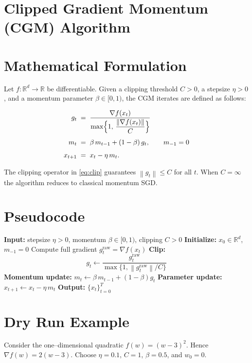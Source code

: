 \documentclass{article}
\newcommand{\norm}[1]{\left\lVert #1 \right\rVert}
\begin{document}
\section*{Clipped Gradient Momentum (CGM) Algorithm}

\section*{Mathematical Formulation}
Let $f:\mathbb{R}^d\rightarrow\mathbb{R}$ be differentiable.  
Given a clipping threshold $C>0$, a stepsize $\eta>0$, and a momentum
parameter $\beta\in[0,1)$, the CGM iterates are defined as follows:

\begin{align}
    g_t &\;=\; \frac{\nabla f(x_t)}{\displaystyle \max\Bigl\{1,\,
        \frac{\norm{\nabla f(x_t)}}{C}\Bigr\}} \label{eq:clip}\\[4pt]
    m_t &\;=\; \beta\, m_{t-1} + (1-\beta)\, g_t ,\qquad m_{-1}=0 \label{eq:momentum}\\[4pt]
    x_{t+1} &\;=\; x_t - \eta\, m_t . \label{eq:update}
\end{align}

The clipping operator in \eqref{eq:clip} guarantees $\norm{g_t}\le C$ for all $t$.  
When $C=\infty$ the algorithm reduces to classical momentum SGD.

\section*{Pseudocode}
\begin{algorithm}[H]
\caption{Clipped Gradient Momentum (CGM)}
\begin{algorithmic}[1]
\STATE \textbf{Input:} stepsize $\eta>0$, momentum $\beta\in[0,1)$, clipping $C>0$
\STATE \textbf{Initialize:} $x_0\in\mathbb{R}^d$, $m_{-1}=0$
    \STATE Compute full gradient $g^{\text{raw}}_t=\nabla f(x_t)$
    \STATE \textbf{Clip:} 
    \[
        g_t \leftarrow \frac{g^{\text{raw}}_t}{\max\{1,\norm{g^{\text{raw}}_t}/C\}}
    \]
    \STATE \textbf{Momentum update:} $m_t \leftarrow \beta\,m_{t-1}+(1-\beta)g_t$
    \STATE \textbf{Parameter update:} $x_{t+1}\leftarrow x_t-\eta\,m_t$
\ENDFOR
\STATE \textbf{Output:} $\{x_t\}_{t=0}^T$
\end{algorithmic}
\end{algorithm}

\section*{Dry Run Example}
Consider the one–dimensional quadratic $f(w)=(w-3)^2$.  
Hence $\nabla f(w)=2(w-3)$.  Choose $\eta=0.1$, $C=1$, $\beta=0.5$, and $w_0=0$.
\end{document}
